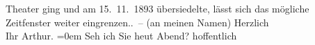 \begin{ledgroupsized}[t]{13cm}
{{{{                     Theater ging und am 15. 11. 1893 übersiedelte, lässt sich das
                     mögliche Zeitfenster weiter eingrenzen.}}}\label{K_L00268_2h}}. – (an meinen Namen)\pend
           \pstart
           Herzlich{\\[\baselineskip]}Ihr \spacefill\mbox{Arthur.}\pend
           \leftskip=0em{}\pstart
           \noindent{}Seh ich Sie heut Abend? hoffentlich\pend
           
         
         \endnumbering{}\end{ledgroupsized}  \newcommand{\dateiname}{L00268}\newcommand{\titel}{Arthur Schnitzler an Richard Beer-Hofmann, [zwischen 5. 10. und 14. 11. 1893]}\newcommand{\editorInnen}{Martin Anton Müller und Gerd-Hermann Susen}
      
